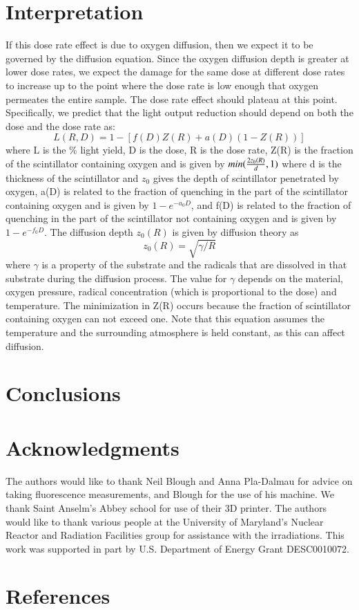 \documentclass[review]{elsarticle}
\begin{document}
\section{Interpretation}


If this dose rate effect is due to oxygen diffusion, then
we expect it to be governed by the diffusion equation.  Since
the oxygen diffusion depth is greater at lower dose rates,
we expect the damage for the same dose at different dose rates to
increase up to the point where the dose rate is low enough that oxygen
permeates the entire sample.  The dose rate effect should plateau
at this point.  Specifically, we predict that the light output
reduction should depend on both the dose and the dose rate as:
$$ L(R,D) = 1 - [f(D)Z(R) + a(D)(1-Z(R))]$$
where L is the \% light yield, D is the dose, R is the dose rate, 
Z(R) is the fraction of the scintillator containing 
oxygen and is given by $min({{2 z_0(R)}\over{d}},1)$
where d is the thickness of the scintillator and $z_0$ gives
the depth of scintillator penetrated by oxygen,
a(D) is related to the fraction of quenching in the part of
the scintillator containing oxygen and is given by $1-e^{-a_0 D}$, 
and
f(D) is related to the fraction of quenching in the part of
the scintillator not containing oxygen and is given by $1-e^{-f_0 D}$.
The diffusion depth $z_0(R)$ is given by diffusion theory as 
$$z_0(R)=\sqrt{\gamma/R}$$
where $\gamma$ is a property of the substrate and the radicals that
are dissolved in that substrate during the diffusion process.
The value for $\gamma$ depends on the material, oxygen pressure,
radical concentration (which is proportional to the dose) and 
temperature.
The minimization in Z(R) occurs because the fraction of scintillator
containing oxygen can not exceed one.  Note that this equation 
assumes the temperature and the surrounding atmosphere
is held constant, as this can 
affect diffusion.


\section{Conclusions}

\section{Acknowledgments}
The authors would like to thank Neil Blough and Anna Pla-Dalmau for advice on taking fluorescence measurements, and Blough for the use of his machine. We thank Saint Anselm's Abbey school for use of their 3D printer.   
The authors would like to thank {\color{red} various people} at
the University of Maryland's Nuclear Reactor and Radiation
Facilities group for assistance
with the irradiations.
This work was supported in part by U.S. Department of Energy Grant DESC0010072.

\section*{References}


\end{document}
